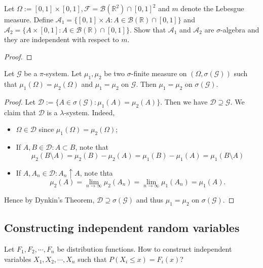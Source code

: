 \documentclass[11pt,singlecolumn, openany, citestyle=authoryear]{elegantbook}
\begin{document}
\begin{CJK}{UTF8}{gbsn}
\begin{exercise}
    Let $\Omega:=[0,1]\times [0,1], \mathcal{F}=\mathcal{B}(\mathbb{R}^2)\cap [0,1]^2$
    and $m$ denote the Lebesgue measure. Define $\mathcal{A}_1 = \{[0,1]\times A:
    A\in\mathcal{B}(\mathbb{R})\cap [0,1]\}$ and $\mathcal{A}_2 = \{A\times [0,1]:
    A\in\mathcal{B}(\mathbb{R})\cap [0,1]\}$. Show that $\mathcal{A}_1$ and $\mathcal{A}_2$
    are $\sigma$-algebra and they are independent with respect to $m$.
\end{exercise}
\begin{proof}
    
\end{proof}

\begin{theorem}
    Let $\mathcal{G}$ be a $\pi$-system. Let $\mu_1, \mu_2$ be two $\sigma$-finite measure on $(\Omega,
    \sigma(\mathcal{G}))$ such that $\mu_1(\Omega)=\mu_2(\Omega)$ and $\mu_1=\mu_2$ on 
    $\mathcal{G}$. Then $\mu_1=\mu_2$ on $\sigma(\mathcal{G})$.
\end{theorem}
\begin{proof}
    Let $\mathcal{D}:=\{A\in\sigma(\mathcal{G}):\mu_1(A)=\mu_2(A)\}$. Then we have 
    $\mathcal{D}\supseteq \mathcal{G}$. We claim that $\mathcal{D}$ is a $\lambda$-system.
    Indeed, 
    \begin{itemize}
        \item $\Omega\in\mathcal{D}$ since $\mu_1(\Omega)=\mu_2(\Omega)$;
        \item If $A,B \in \mathcal{D}:A\subset B$, note that 
        $$
        \mu_2(B\setminus A) =\mu_2(B)-\mu_2(A)=\mu_1(B)-\mu_1(A)=\mu_1(B\setminus A)
        $$
        \item If $A,A_n \in \mathcal{D}:A_n \uparrow A$, note thta 
        $$
        \mu_2(A)=\lim_{n\to\infty} \mu_2(A_n)=\lim_{n\to\infty}\mu_1(A_n)=\mu_1(A).
        $$
    \end{itemize}
    Hence by Dynkin's Theorem, $\mathcal{D}\supseteq \sigma(\mathcal{G})$ and thus 
    $\mu_1=\mu_2$ on $\sigma(\mathcal{G})$.
\end{proof}

\subsection*{Constructing independent random variables}
Let $F_1,F_2,\cdots,F_n$ be distribution functions. How to construct independent variables
$X_1,X_2,\cdots,X_n$ such that $P(X_i\leqslant x)=F_i(x)$?


\end{CJK}
\end{document}
